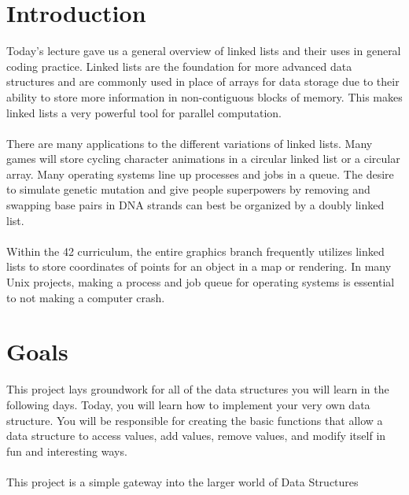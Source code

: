 \documentclass{42-en}
\begin{document}
\chapter{Introduction}
    Today's lecture gave us a general overview of linked lists and their
    uses in general coding practice. Linked lists are the foundation for
    more advanced data structures and are commonly used in place of arrays
    for data storage due to their ability to store more information in
    non-contiguous blocks of memory. This makes linked lists a very powerful
    tool for parallel computation.\\
    \\
    There are many applications to the different variations of linked lists.
    Many games will store cycling character animations in a circular linked
    list or a circular array. Many operating systems line up processes and 
    jobs in a queue. The desire to simulate genetic mutation and give people
    superpowers by removing and swapping base pairs in DNA strands can best
    be organized by a doubly linked list.\\
    \\
    Within the 42 curriculum, the entire graphics branch frequently utilizes
    linked lists to store coordinates of points for an object in a map or
    rendering. In many Unix projects, making a process and job queue for
    operating systems is essential to not making a computer crash.



\chapter{Goals}
    This project lays groundwork for all of the data structures you will learn
    in the following days. Today, you will learn how to implement your very own
    data structure. You will be responsible for creating the basic functions
    that allow a data structure to access values, add values, remove values, and
    modify itself in fun and interesting ways.\\
    \\
    This project is a simple gateway into the larger world of Data Structures
\end{document}

